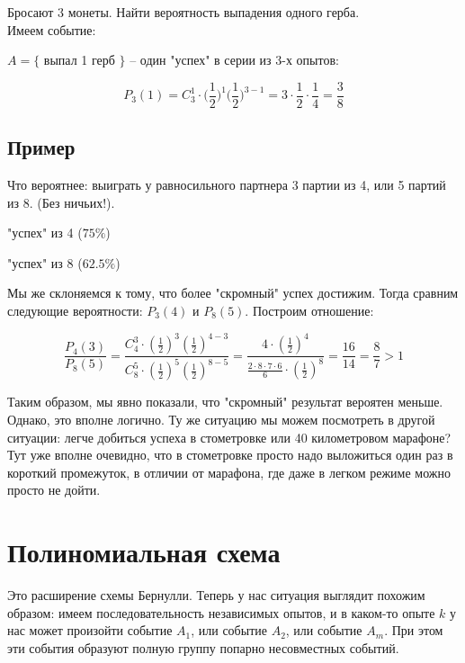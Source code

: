 \documentclass{article}
\begin{document}
Бросают 3 монеты. Найти вероятность выпадения одного герба.
\\

Имеем событие:

$A = \{$ выпал 1 герб $\}$ -- один "успех" в серии из 3-х опытов:

$$P_3(1) = C_3^1 \cdot \Biggl(\frac{1}{2}\Biggr)^1 \Biggl(\frac{1}{2}\Biggr)^{3 - 1} = 3 \cdot \frac{1}{2} \cdot \frac{1}{4} = \frac{3}{8}$$

\subsection{Пример}

Что вероятнее: выиграть у равносильного партнера 3 партии из 4, или 5 партий из 8. (Без ничьих!).

"успех" из 4 ($75\%$)

"успех" из 8 ($62.5\%$)

Мы же склоняемся к тому, что более "скромный" успех достижим. Тогда сравним следующие вероятности:
$P_3(4)$ и $P_8(5)$. Построим отношение:

$$ \frac{P_4(3)}{P_8(5)} = \frac{C_4^3 \cdot (\frac{1}{2})^3 (\frac{1}{2})^{4 - 3}}
{C_8^5 \cdot (\frac{1}{2})^5 (\frac{1}{2})^{8 - 5}} = \frac{4\cdot (\frac{1}{2})^4}{\frac{2 \cdot 8 \cdot 7 \cdot 6}{6} \cdot (\frac{1}{2})^8} = \frac{16}{14} = \frac{8}{7} > 1$$

Таким образом, мы явно показали, что "скромный" результат вероятен меньше. Однако, это вполне логично. Ту же ситуацию мы можем посмотреть в другой ситуации: легче добиться успеха в стометровке или 40 километровом марафоне? Тут уже вполне очевидно, что в стометровке просто надо выложиться один раз в короткий промежуток, в отличии от марафона, где даже в легком режиме можно просто не дойти.

\section{Полиномиальная схема}

Это расширение схемы Бернулли. Теперь у нас ситуация выглядит похожим образом: имеем последовательность независимых опытов, и в каком-то опыте $k$ у нас может произойти событие $A_1$, или событие $A_2$, или событие $A_m$. При этом эти события образуют полную группу попарно несовместных событий.
\end{document}
